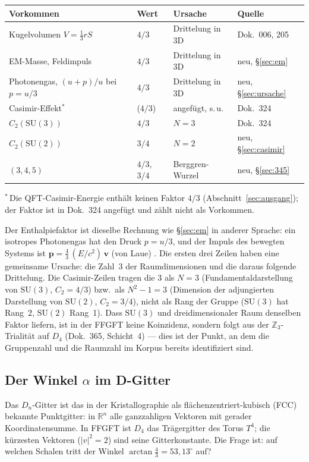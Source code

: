 \begin{center}
\begin{tabular}{@{}llll@{}}
\toprule
Vorkommen & Wert & Ursache & Quelle \\
\midrule
Kugelvolumen $V = \tfrac13 rS$ & $4/3$ & Drittelung in 3D & Dok.~006, 205 \\
EM-Masse, Feldimpuls & $4/3$ & Drittelung in 3D & neu, §\ref{sec:em} \\
Photonengas, $(u+p)/u$ bei $p=u/3$ & $4/3$ & Drittelung in 3D & neu, §\ref{sec:ursache} \\
Casimir-Effekt$^{*}$ & ($4/3$) & angefügt, s.\,u. & Dok.~324 \\
$C_2(\mathrm{SU}(3))$ & $4/3$ & $N=3$ & Dok.~324 \\
$C_2(\mathrm{SU}(2))$ & $3/4$ & $N=2$ & neu, §\ref{sec:casimir} \\
$(3,4,5)$ & $4/3$, $3/4$ & Berggren-Wurzel & neu, §\ref{sec:345} \\
\bottomrule
\end{tabular}
\end{center}
\noindent$^{*}$\,Die QFT-Casimir-Energie enthält keinen Faktor $4/3$ (Abschnitt~\ref{sec:ausgang}); der Faktor ist in Dok.~324 angefügt und zählt nicht als Vorkommen.


Der Enthalpiefaktor ist dieselbe Rechnung wie §\ref{sec:em} in anderer
Sprache: ein isotropes Photonengas hat den Druck $p = u/3$, und der Impuls des
bewegten Systems ist $\mathbf p = \tfrac{4}{3}\,(E/c^2)\,\mathbf v$ (von Laue) \EM.
Die ersten drei Zeilen haben eine gemeinsame Ursache: die Zahl~3 der
Raumdimensionen und die daraus folgende Drittelung. Die Casimir-Zeilen tragen
die 3 als $N=3$ (Fundamentaldarstellung von $\mathrm{SU}(3)$, $C_2=4/3$) bzw.\ als
$N^2-1=3$ (Dimension der adjungierten Darstellung von $\mathrm{SU}(2)$, $C_2=3/4$),
nicht als Rang der Gruppe ($\mathrm{SU}(3)$ hat Rang~2, $\mathrm{SU}(2)$ Rang~1). Dass $\mathrm{SU}(3)$ und dreidimensionaler Raum
denselben Faktor liefern, ist in der FFGFT keine Koinzidenz, sondern folgt aus
der $\mathbb Z_3$-Trialität auf $D_4$ (Dok.~365, Schicht~4) --- dies ist der
Punkt, an dem die Gruppenzahl und die Raumzahl im Korpus bereits identifiziert
sind.

\subsection{Der Winkel $\alpha$ im D-Gitter \BM}
\label{sec:winkel}

Das $D_n$-Gitter ist das in der Kristallographie als flächenzentriert-kubisch
(FCC) bekannte Punktgitter: in $\mathbb R^n$ alle ganzzahligen Vektoren mit
gerader Koordinatensumme. In FFGFT ist $D_4$ das Trägergitter des Torus $T^4$;
die kürzesten Vektoren ($|v|^2=2$) sind seine Gitterkonstante. Die Frage ist:
auf welchen Schalen tritt der Winkel $\arctan\tfrac43 = 53{,}13^\circ$ auf?

